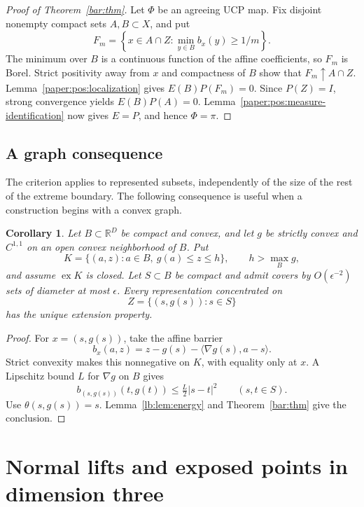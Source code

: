 \documentclass[11pt,letterpaper]{amsart}
\newtheorem{corollary}[theorem]{Corollary}
\theoremstyle{definition}
\theoremstyle{remark}
\numberwithin{equation}{section}
\DeclareMathOperator{\ex}{ex}
\begin{document}
\begin{proof}[Proof of Theorem~\ref{bar:thm}]
Let $\Phi$ be an agreeing UCP map. Fix disjoint nonempty
compact sets $A,B\subset X$, and put
\[
 F_m=\left\{x\in A\cap Z:
                    \min_{y\in B}b_x(y)\ge1/m\right\}.
\]
The minimum over $B$ is a continuous function of the affine
coefficients, so $F_m$ is Borel. Strict positivity away from
$x$ and compactness of $B$ show that $F_m\uparrow A\cap Z$.
Lemma~\ref{paper:pos:localization} gives $E(B)P(F_m)=0$.
Since $P(Z)=I$, strong convergence yields $E(B)P(A)=0$.
Lemma~\ref{paper:pos:measure-identification} now gives
$E=P$, and hence $\Phi=\pi$.
\end{proof}

\subsection{A graph consequence}

The criterion applies to represented subsets, independently of
the size of the rest of the extreme boundary. The following
consequence is useful when a construction begins with a
convex graph.

\begin{corollary}\label{cap:cor:graph}
Let $B\subset\mathbb R^D$ be compact and convex, and let $g$
be strictly convex and $C^{1,1}$ on an open convex neighborhood
of $B$. Put
\[
 K=\{(a,z):a\in B,\ g(a)\le z\le h\},
 \qquad h>\max_B g,
\]
and assume $\ex K$ is closed. Let $S\subset B$ be compact
and admit covers by $O(\epsilon^{-2})$ sets of diameter at
most $\epsilon$. Every representation concentrated on
\[
                 Z=\{(s,g(s)):s\in S\}
\]
has the unique extension property.
\end{corollary}
\begin{proof}
For $x=(s,g(s))$, take the affine barrier
\[
 b_x(a,z)=z-g(s)-\langle\nabla g(s),a-s\rangle.
\]
Strict convexity makes this nonnegative on $K$, with equality
only at $x$. A Lipschitz bound $L$ for $\nabla g$ on $B$
gives
\[
 b_{(s,g(s))}(t,g(t))\le\tfrac L2|s-t|^2
 \qquad(s,t\in S).
\]
Use $\theta(s,g(s))=s$. Lemma~\ref{lb:lem:energy} and
Theorem~\ref{bar:thm} give the conclusion.
\end{proof}

\section{Normal lifts and exposed points in dimension three}
\label{paper:pos:normal-lifts}
\end{document}
